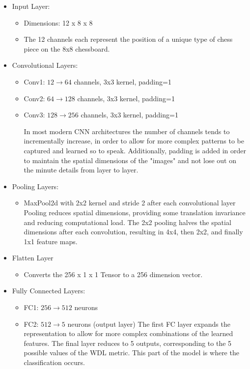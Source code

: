 \begin{itemize}
    \item Input Layer:
    \begin{itemize}
        \item Dimensions: 12 x 8 x 8
        \item The 12 channels each represent the position of a unique type of chess piece on the 8x8 chessboard.
    \end{itemize}

    \newpage
    
    \item Convolutional Layers:
    \begin{itemize}
        \item Conv1: $12 \rightarrow 64$ channels, 3x3 kernel, padding=1
        \item Conv2: $64 \rightarrow 128$ channels, 3x3 kernel, padding=1
        \item Conv3: $128 \rightarrow 256$ channels, 3x3 kernel, padding=1

        In most modern CNN architectures the number of channels tends to incrementally increase, in order to allow for more complex patterns to be captured and learned so to speak. Additionally, padding is added in order to maintain the spatial dimensions of the "images" and not lose out on the minute details from layer to layer.
    \end{itemize}

    \item Pooling Layers:
    \begin{itemize}
        \item MaxPool2d with 2x2 kernel and stride 2 after each convolutional layer
        Pooling reduces spatial dimensions, providing some translation invariance and reducing computational load. The 2x2 pooling halves the spatial dimensions after each convolution, resulting in 4x4, then 2x2, and finally 1x1 feature maps.
    \end{itemize}
    
    \item Flatten Layer
    \begin{itemize}
        \item Converts the 256 x 1 x 1 Tensor to a 256 dimension vector.
    \end{itemize}
    
    \item Fully Connected Layers:
    \begin{itemize}
        \item FC1: $256 \rightarrow 512$ neurons
        \item FC2: $512 \rightarrow 5$ neurons (output layer)
        The first FC layer expands the representation to allow for more complex combinations of the learned features. The final layer reduces to 5 outputs, corresponding to the 5 possible values of the WDL metric. This part of the model is where the classification occurs.
    \end{itemize}
    

\end{itemize}
